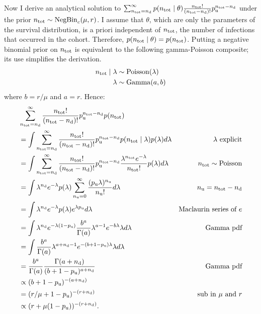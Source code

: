 \documentclass[thesis.tex]{subfiles}
\begin{document}
Now I derive an analytical solution to $\sum_{n_\text{tot}=n_\text{d}}^\infty p(n_\text{tot} \mid \theta) \frac{n_\text{tot}!}{(n_\text{tot} - n_\text{d})!} p_\text{u}^{n_\text{tot} - n_\text{d}}$ under the prior $n_\text{tot} \sim \operatorname{NegBin}_{c}(\mu, r)$.
I assume that $\theta$, which are only the parameters of the survival distribution, is a priori independent of $n_\text{tot}$, the number of infections that occurred in the cohort.
Therefore, $p(n_\text{tot} \mid \theta) = p(n_\text{tot})$.
Putting a negative binomial prior on $n_\text{tot}$ is equivalent to the following gamma-Poisson composite; its use simplifies the derivation.
\begin{align}
n_\text{tot} \mid \lambda &\sim \operatorname{Poisson}(\lambda) \\
\lambda &\sim \operatorname{Gamma}(a, b)
\end{align}
where $b = r / \mu$ and $a = r$.
Hence:
\begin{align}
&\sum_{n_\text{tot}=n_\text{d}}^\infty \frac{n_\text{tot}!}{(n_\text{tot}-n_\text{d})!} p_\text{u}^{n_\text{tot}-n_\text{d}} p(n_\text{tot}) \\
&= \int \sum_{n_\text{tot}=n_\text{d}}^\infty \frac{n_\text{tot}!}{(n_\text{tot}-n_\text{d})!} p_\text{u}^{n_\text{tot}-n_\text{d}} p(n_\text{tot} \mid \lambda) p(\lambda) d\lambda &\text{$\lambda$ explicit}\\
&= \int \sum_{n_\text{tot}=n_\text{d}}^\infty \frac{n_\text{tot}!}{(n_\text{tot}-n_\text{d})!} p_\text{u}^{n_\text{tot}-n_\text{d}} \frac{\lambda^{n_\text{tot}} e^{-\lambda}}{n_\text{tot}!} p(\lambda) d\lambda &n_\text{tot} \sim \operatorname{Poisson}\\
&= \int \lambda^{n_\text{d}} e^{-\lambda} p(\lambda) \sum_{n_\text{u}=0}^\infty \frac{(p_\text{u} \lambda)^{n_\text{u}}}{n_\text{u}!} d\lambda &n_\text{u} = n_\text{tot}-n_\text{d}\\
&= \int \lambda^{n_\text{d}} e^{-\lambda} p(\lambda) e^{\lambda p_\text{u}} d\lambda &\text{Maclaurin series of $e$} \\
&= \int \lambda^{n_\text{d}} e^{-\lambda(1 - p_\text{u})} \frac{b^a}{\Gamma(a)} \lambda^{a-1} e^{-b\lambda} \lambda d\lambda &\text{Gamma pdf}\\
&= \int \frac{b^a}{\Gamma(a)} \lambda^{a+n_\text{d}-1} e^{-(b+1-p_\text{u})\lambda} \lambda d\lambda \\
&= \frac{b^a}{\Gamma(a)} \frac{\Gamma(a+n_\text{d})}{(b+1-p_\text{u})^{a+n_\text{d}}} &\text{Gamma pdf}\\
&\propto (b+1-p_\text{u})^{-(a+n_\text{d})} \\
&= (r/\mu + 1 - p_\text{u})^{-(r+n_\text{d})} &\text{sub in $\mu$ and $r$}\\
&\propto(r + \mu (1- p_\text{u}))^{-(r+n_\text{d})}.
\end{align}
\end{document}
